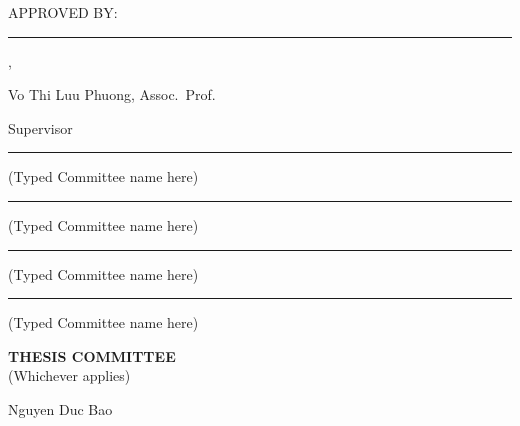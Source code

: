 \documentclass[12pt,a4paper,oneside]{report}
\begin{document}
\clearpage
\hypersetup{pageanchor=true}
\setcounter{page}{1}

\thispagestyle{plain}
{\raggedright
\vspace*{1.0cm}
APPROVED BY:\par\vspace{1.3cm}

\rule{7.5cm}{0.5pt},\par\vspace{0.25cm}
Vo Thi Luu Phuong, Assoc.\ Prof.\par
Supervisor\par\vspace{1.2cm}

\rule{7.5cm}{0.5pt}\par\vspace{0.15cm}
(Typed Committee name here)\par\vspace{0.9cm}

\rule{7.5cm}{0.5pt}\par\vspace{0.15cm}
(Typed Committee name here)\par\vspace{0.9cm}

\rule{7.5cm}{0.5pt}\par\vspace{0.15cm}
(Typed Committee name here)\par\vspace{0.9cm}

\rule{7.5cm}{0.5pt}\par\vspace{0.15cm}
(Typed Committee name here)\par\vspace{1.6cm}
}

\begin{center}
  \textbf{THESIS COMMITTEE}\\
  (Whichever applies)\par\vspace{1.1cm}
  Nguyen Duc Bao
\end{center}

\clearpage

\end{document}
